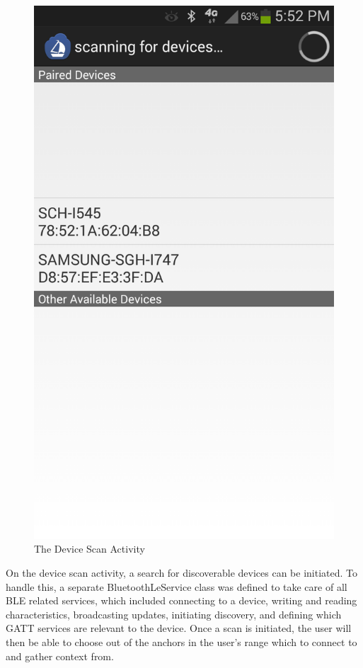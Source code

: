 \documentclass{sig-alternate}
\begin{document}
\begin{figure}[h!]
	\begin{center}
		\includegraphics[width=.5\linewidth]{device_scan}
	\end{center}
	\vspace{-12pt}
	\caption{The Device Scan Activity}
	\label{fig:Device Scan}
\end{figure}

On the device scan activity, a search for discoverable devices
can be initiated. To handle this, a separate BluetoothLeService
class was defined to take care of all BLE related services,
which included connecting to a device, writing and reading
characteristics, broadcasting updates, initiating discovery, 
and defining which GATT services are relevant to the device.
Once a scan is initiated, the user will then be able to
choose out of the anchors in the user's range which to 
connect to and gather context from.
\end{document}
